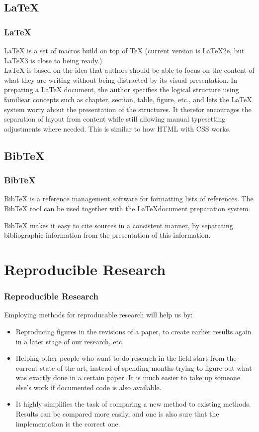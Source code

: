 \documentclass[pdf]{beamer}
\begin{document}
\subsection{\LaTeX}
\begin{frame}%
  \frametitle{\LaTeX}
 \LaTeX{} is a set of macros build on top of TeX (current version is \LaTeX 2e, but \LaTeX 3 is close to being ready.)\\
\vspace{1cm}
 \LaTeX{} is based on the idea that authors should be able to focus on the content of what they are writing without being distracted by its visual presentation. In preparing a \LaTeX{} document, the author specifies the logical structure using familiear concepts such as chapter, section, table, figure, etc., and lets the \LaTeX{} system worry about the presentation of the structures. It therefor encourages the separation of layout from content while still allowing manual typesetting adjustments where needed. This is similar to how HTML with CSS works.
\end{frame}

\subsection{BibTeX}
\begin{frame}
  \frametitle{BibTeX}
  BibTeX is a reference management software for formatting lists of references. The BibTeX tool can be used together with the \LaTeX document preparation system.
  
BibTeX makes it easy to cite sources in a consistent manner, by separating bibliographic information from the presentation of this information. 
\end{frame}

\section{Reproducible Research}

\begin{frame}
  \frametitle{Reproducible Research}
Employing methods for reproducable research will help us by:
\begin{itemize}
\item Reproducing figures in the revisions of a paper, to create earlier results again in a later stage of our research, etc.
\item Helping other people who want to do research in the field start from the current state of the art, instead of spending months trying to figure out what was exactly done in a certain paper. It is much easier to take up someone else's work if documented code is also available.
\item It highly simplifies the task of comparing a new method to existing methods. Results can be compared more easily, and one is also sure that the implementation is the correct one.
\end{itemize}
\end{frame}
\end{document}

